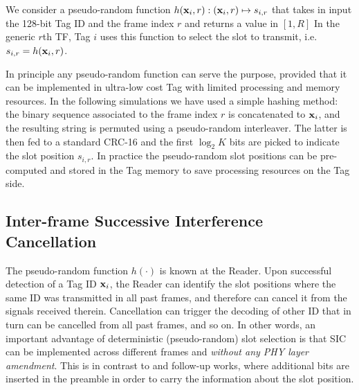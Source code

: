 \documentclass[12pt,draftcls,onecolumn]{IEEEtran}
\begin{document}
We consider a pseudo-random function $h(\mathbf{\boldsymbol{x}}_{i},r): (\mathbf{\boldsymbol{x}}_{i},r) \mapsto s_{i,r}$
 that takes in input the 128-bit Tag ID and the frame index $r$ and returns a value in $[1,R]$ In the generic $r$th TF,  Tag $i$ uses this function to select the slot to transmit, i.e. $s_{i,r} = h(\mathbf{\boldsymbol{x}}_{i},r)$.




In principle any pseudo-random function can serve the purpose, provided that it can be implemented in ultra-low cost Tag with limited processing and memory resources.
In the following simulations we have used a simple hashing method: the binary sequence associated to the frame index $r$ is concatenated to $\mathbf{\boldsymbol{x}}_{i}$, and the resulting string is permuted using a pseudo-random interleaver. The latter is then fed to a standard CRC-16 and the first  $\log_2{K}$ bits are picked to indicate the slot position $s_{i,r}$. {In practice the pseudo-random slot positions can be pre-computed and stored in the Tag memory to save processing resources on the Tag side.}


\subsection{Inter-frame Successive Interference Cancellation}\label{sec:isic}

The pseudo-random function $h(\cdot)$ is known at the Reader.
Upon successful detection of a Tag ID $\mathbf{\boldsymbol{x}}_{i}$, the Reader can identify the slot positions where the same ID was transmitted in all past frames, and therefore can cancel it from the signals received therein. Cancellation can trigger the decoding of other ID that in turn can be cancelled from all past frames, and so on.
In other words, an important  advantage of deterministic (pseudo-random) slot selection is that SIC can be implemented  across different frames and \emph{without any PHY layer amendment}. This is in contrast to \cite{cassini07} and follow-up works, where additional bits are inserted in the preamble in order to carry the information about the slot position.
\end{document}
